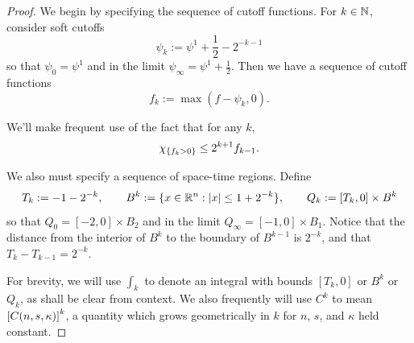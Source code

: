 \begin{proof}
We begin by specifying the sequence of cutoff functions.  For $k \in \mathbb{N}$, consider soft cutoffs
\[ \psi_k := \psi^1 + \frac{1}{2} - 2^{-k-1} \]
so that $\psi_0 = \psi^1$ and in the limit $\psi_\infty = \psi^1 + \frac{1}{2}$.  Then we have a sequence of cutoff functions
\[ f_k := \max(f - \psi_k,0). \]

We'll make frequent use of the fact that for any $k$,
\begin{equation}\label{indicator_bound} 
\chi_{\{f_k > 0\}} \leq 2^{k+1} f_{k-1}. 
\end{equation}

We also must specify a sequence of space-time regions.  Define
\[ T_k := -1-2^{-k}, \qquad B^k := \{x \in \mathbb{R}^n: |x| \leq 1 + 2^{-k}\}, \qquad Q_k := [T_k,0]\times B^k \]
so that $Q_0 = [-2,0]\times B_2$ and in the limit $Q_\infty = [-1,0]\times B_1$.  Notice that the distance from the interior of $B^k$ to the boundary of $B^{k-1}$ is $2^{-k}$, and that $T_k - T_{k-1} = 2^{-k}$.  

For brevity, we will use $\int_k$ to denote an integral with bounds $[T_k,0]$ or $B^k$ or $Q_k$, as shall be clear from context.  We also frequently will use $C^k$ to mean $\left[ C(n,s,\kappa) \right]^k$, a quantity which grows geometrically in $k$ for $n$, $s$, and $\kappa$ held constant.  
%





\end{proof}
